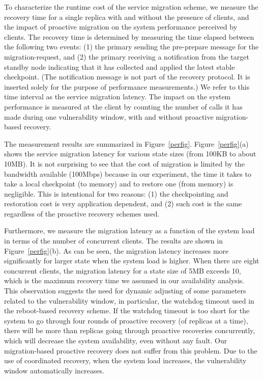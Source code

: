 \documentclass[times, 10pt, twocolumn]{article}
\begin{document}
To characterize the runtime cost of the service migration scheme, we measure 
the recovery time for a single replica with and without the presence of
clients, and the impact of proactive migration on the system performance
perceived by clients. The recovery time is determined by measuring the time 
elapsed between the following two events: (1) the primary sending the 
{\sc pre-prepare} message for the {\sc migration-request}, and
(2) the primary receiving a notification from the target standby node 
indicating that it has collected and applied the latest stable checkpoint. 
(The notification message is not part of the recovery protocol. It is
inserted solely for the purpose of performance measurements.) We refer
to this time interval as the service migration latency. The impact on the 
system performance is measured at the client by counting the number of
calls it has made during one vulnerability window, with and without proactive
migration-based recovery.

The measurement results are summarized in Figure~\ref{perfig}. 
Figure~\ref{perfig}(a) shows the service migration latency for various
state sizes (from 100KB to about 10MB). It is not surprising to see that the 
cost of migration is limited by the bandwidth available (100Mbps) because
in our experiment, the time it takes to take a local checkpoint (to
memory) and to restore one (from memory) is negligible. This is intentional
for two reasons: (1) the checkpointing and restoration cost is very
application dependent, and (2) such cost is the same regardless of the
proactive recovery schemes used. 

Furthermore, we measure the migration
latency as a function of the system load in terms of the number of 
concurrent clients. The results are shown in Figure~\ref{perfig}(b).
As can be seen, the migration latency increases more significantly for 
larger state when the system load is higher. When there are eight
concurrent clients, the migration latency for a state size of 5MB exceeds
10, which is the maximum recovery time we assumed in our availability
analysis. This observation suggests the need for dynamic adjusting
of some parameters related to the vulnerability window, in particular,
the watchdog timeout used in the reboot-based recovery scheme. If the
watchdog timeout is too short for the system to go through four rounds
of proactive recovery (of  replicas at a time), there will be more
than  replicas going through proactive recoveries concurrently, which will 
decrease the system availability, even without any fault.
Our migration-based proactive recovery does not suffer from this problem.
Due to the use of coordinated recovery, when the system load increases, the
vulnerability window automatically increases.
\end{document}
